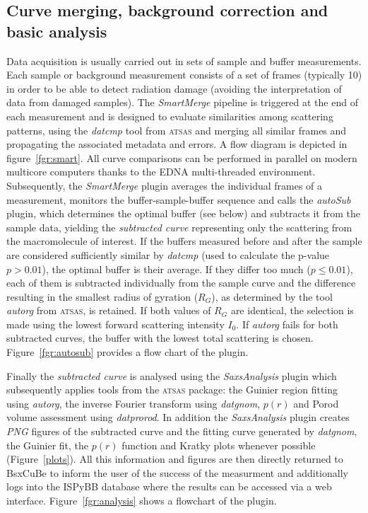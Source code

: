 \documentclass[preprint,pdf]{iucr}              %
\begin{document}
\subsection{Curve merging, background correction and basic analysis}
\label{SM}
Data acquisition is usually carried out in sets of sample and buffer
measurements.
Each sample or background measurement consists of a set of frames
(typically 10) in order to be able to detect radiation damage
(avoiding the interpretation of data from damaged samples).
The \textit{SmartMerge} pipeline is triggered at the end of each measurement
and is designed to evaluate similarities among scattering
patterns, using the \textit{datcmp} tool from \textsc{atsas} and merging all
similar frames and propagating the associated metadata and
errors.
A flow diagram is depicted in figure~\ref{fgr:smart}.
All curve comparisons can be performed in parallel on modern multicore
computers thanks to the EDNA multi-threaded environment.
Subsequently, the \textit{SmartMerge} plugin averages the individual frames
of a measurement, monitors the buffer-sample-buffer sequence and
 calls the \textit{autoSub} plugin, which determines the optimal buffer
(see below) and subtracts it from the sample data, yielding the 
\textit{subtracted curve} representing only the scattering from the
macromolecule of interest.
If the buffers measured before and after the sample are considered sufficiently
similar by \textit{datcmp} (used to calculate the p-value $p > 0.01$), the
optimal buffer is their average.
If they differ too much ($p \leq 0.01$), each of them is subtracted individually from the
sample curve and the difference resulting in  the smallest radius of
gyration ($R_{G}$), as determined by the tool \textit{autorg} from \textsc{atsas}, is retained.
If both values of $R_{G}$ are identical, the selection is made using the lowest forward scattering intensity $I_{0}$.
If \textit{autorg} fails for both subtracted curves, the buffer with the lowest
total scattering is chosen.
Figure~\ref{fgr:autosub} provides a flow chart of the plugin.

Finally the \textit{subtracted curve} is analysed using the
\textit{SaxsAnalysis} plugin which subsequently applies tools from the
\textsc{atsas} package: the Guinier region fitting using \textit{autorg}, 
the inverse Fourier transform using \textit{datgnom}, 
$p(r)$ and Porod volume assessment using \textit{datprorod}.
In addition the \textit{SaxsAnalysis} plugin creates \textit{PNG} figures of
the subtracted curve and the fitting curve generated by \textit{datgnom}, the
Guinier fit, the $p(r)$ function and Kratky plots whenever possible (Figure~\ref{plots}).
All this information and figures are then directly returned to BsxCuBe to inform
the user of the success of the measurment and additionally logs into the
ISPyBB database \cite{ISPYBB} where the results can be accessed via a web
interface.
Figure~\ref{fgr:analysis} shows a flowchart of the plugin.
\end{document}
